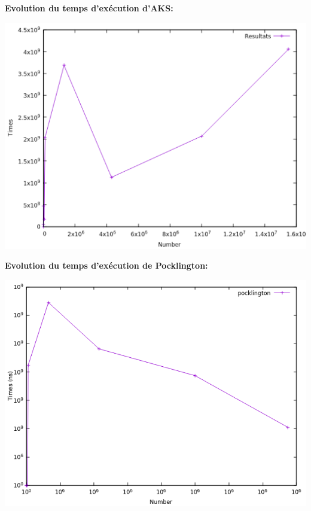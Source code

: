 		\begin{frame}
		\textbf{Evolution du temps d'exécution d'AKS: }
		\begin{center}\includegraphics[scale=0.6]{AKS.png}\end{center}
		\end{frame}
		
		\begin{frame}
		\textbf{Evolution du temps d'exécution de Pocklington: }
		\begin{center}\includegraphics[scale=0.6]{pocklington.png}\end{center}
		\end{frame}
		
